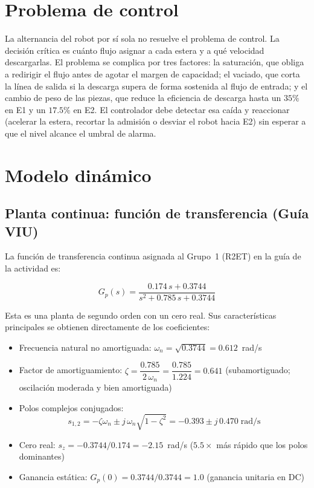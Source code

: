 \section{Problema de control}

La alternancia del robot por sí sola no resuelve el problema de control. La decisión crítica es cuánto flujo asignar a cada estera y a qué velocidad descargarlas. El problema se complica por tres factores: la saturación, que obliga a redirigir el flujo antes de agotar el margen de capacidad; el vaciado, que corta la línea de salida si la descarga supera de forma sostenida al flujo de entrada; y el cambio de peso de las piezas, que reduce la eficiencia de descarga hasta un $35\%$ en E1 y un $17.5\%$ en E2. El controlador debe detectar esa caída y reaccionar (acelerar la estera, recortar la admisión o desviar el robot hacia E2) sin esperar a que el nivel alcance el umbral de alarma.

\section{Modelo dinámico}

\subsection*{Planta continua: función de transferencia (Guía VIU)}

La función de transferencia continua asignada al Grupo~1 (R2ET) en la guía de la actividad es:

\begin{equation}
G_p(s) = \frac{0.174\,s + 0.3744}{s^2 + 0.785\,s + 0.3744}
\label{eq:planta_continua}
\end{equation}

Esta es una planta de segundo orden con un cero real. Sus características principales se obtienen directamente de los coeficientes:

\begin{itemize}
  \item Frecuencia natural no amortiguada: $\omega_n = \sqrt{0.3744} = 0.612$~rad/s
  \item Factor de amortiguamiento: $\zeta = \dfrac{0.785}{2\,\omega_n} = \dfrac{0.785}{1.224} = 0.641$ \quad (subamortiguado; oscilación moderada y bien amortiguada)
  \item Polos complejos conjugados:
        \[s_{1,2} = -\zeta\omega_n \pm j\,\omega_n\sqrt{1-\zeta^2}
                  = -0.393 \pm j\,0.470 \;\text{rad/s}\]
  \item Cero real: $s_z = -0.3744/0.174 = -2.15$~rad/s \quad ($5.5\times$ más rápido que los polos dominantes)
  \item Ganancia estática: $G_p(0) = 0.3744/0.3744 = 1.0$ (ganancia unitaria en DC)
\end{itemize}


